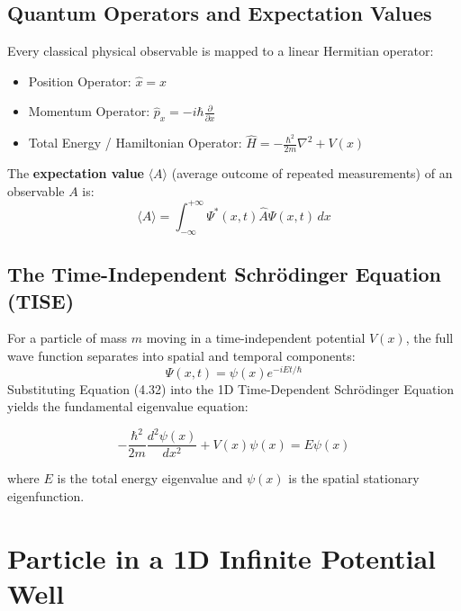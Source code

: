 \subsection{Quantum Operators and Expectation Values}
Every classical physical observable is mapped to a linear Hermitian operator:
\begin{itemize}
    \item Position Operator: $\hat{x} = x$
    \item Momentum Operator: $\hat{p}_x = -i\hbar \frac{\partial}{\partial x}$
    \item Total Energy / Hamiltonian Operator: $\hat{H} = -\frac{\hbar^2}{2m}\nabla^2 + V(x)$
\end{itemize}
The \textbf{expectation value} $\langle A \rangle$ (average outcome of repeated measurements) of an observable $A$ is:
\begin{equation}
    \langle A \rangle = \int_{-\infty}^{+\infty} \Psi^*(x,t) \hat{A} \Psi(x,t)\,dx
\end{equation}

\subsection{The Time-Independent Schrödinger Equation (TISE)}
For a particle of mass $m$ moving in a time-independent potential $V(x)$, the full wave function separates into spatial and temporal components:
\begin{equation}
    \Psi(x,t) = \psi(x) e^{-i E t / \hbar}
\end{equation}
Substituting Equation (4.32) into the 1D Time-Dependent Schrödinger Equation yields the fundamental eigenvalue equation:

\begin{keyequation}
\begin{equation}
    -\frac{\hbar^2}{2m}\frac{d^2\psi(x)}{dx^2} + V(x)\psi(x) = E\psi(x)
\end{equation}
\end{keyequation}
where $E$ is the total energy eigenvalue and $\psi(x)$ is the spatial stationary eigenfunction.

\section{Particle in a 1D Infinite Potential Well}

